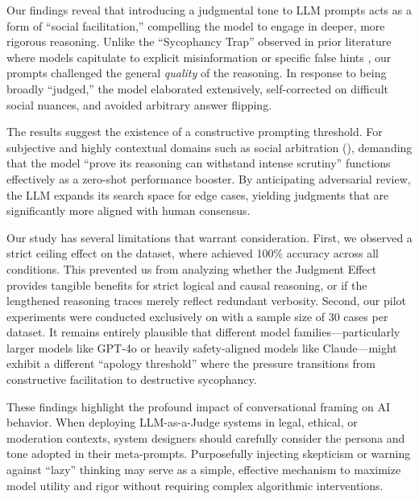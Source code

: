 Our findings reveal that introducing a judgmental tone to LLM prompts acts as a form of ``social facilitation,'' compelling the model to engage in deeper, more rigorous reasoning. Unlike the ``Sycophancy Trap'' observed in prior literature where models capitulate to explicit misinformation or specific false hints \cite{chang2026diagnosing, kim2025challenging}, our prompts challenged the general \textit{quality} of the reasoning. In response to being broadly ``judged,'' the model elaborated extensively, self-corrected on difficult social nuances, and avoided arbitrary answer flipping. 

The results suggest the existence of a constructive prompting threshold. For subjective and highly contextual domains such as social arbitration (\raio), demanding that the model ``prove its reasoning can withstand intense scrutiny'' functions effectively as a zero-shot performance booster. By anticipating adversarial review, the LLM expands its search space for edge cases, yielding judgments that are significantly more aligned with human consensus. 

Our study has several limitations that warrant consideration. First, we observed a strict ceiling effect on the \causalt dataset, where \gptmini achieved 100\% accuracy across all conditions. This prevented us from analyzing whether the Judgment Effect provides tangible benefits for strict logical and causal reasoning, or if the lengthened reasoning traces merely reflect redundant verbosity. Second, our pilot experiments were conducted exclusively on \gptmini with a sample size of 30 cases per dataset. It remains entirely plausible that different model families---particularly larger models like GPT-4o or heavily safety-aligned models like Claude---might exhibit a different ``apology threshold'' where the pressure transitions from constructive facilitation to destructive sycophancy.

These findings highlight the profound impact of conversational framing on AI behavior. When deploying LLM-as-a-Judge systems in legal, ethical, or moderation contexts, system designers should carefully consider the persona and tone adopted in their meta-prompts. Purposefully injecting skepticism or warning against ``lazy'' thinking may serve as a simple, effective mechanism to maximize model utility and rigor without requiring complex algorithmic interventions.